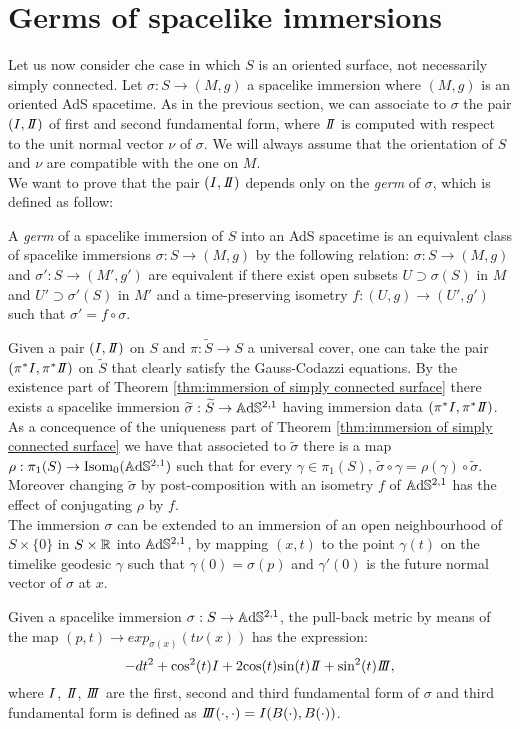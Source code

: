 \section{Germs of spacelike immersions}
Let us now consider che case in which $S$ is an oriented surface, not necessarily simply connected. Let $\sigma: S \to(M,g)$ a spacelike immersion where $(M,g)$ is an oriented AdS spacetime.
As in the previous section, we can associate to $\sigma$ the pair $(\I,\II)$ of first and second  fundamental form, where $\II$ is  computed with respect to the unit normal vector $\nu$ of $\sigma$.
We will always assume that the orientation of $S$ and $\nu$ are compatible with the one on $M$.\\
We want to prove that the pair $(\I,\II)$ depends only on the \textit{germ} of $\sigma$, which is defined as follow:
\begin{definition}
    A \textit{germ} of a spacelike immersion of $S$ into an AdS spacetime is an equivalent class of spacelike immersions $\sigma:S \to(M,g)$ by the following relation: $\sigma:S \to(M,g)$ and $\sigma':S \to(M',g')$ are equivalent if there exist open subsets $U \supset \sigma(S)$ in $M$ and $U' \supset \sigma'(S)$ in $M'$ and a time-preserving isometry $f:(U,g)\to(U',g')$ such that $\sigma' = f \circ \sigma$.
\end{definition}
Given a pair $(\I,\II)$ on $S$ and $\pi: \widetilde{S}\to S$ a universal cover, one can take the pair $(\pi^*\I, \pi^*\II)$ on $\widetilde{S}$ that clearly satisfy the Gauss-Codazzi equations. By the existence part of Theorem \ref{thm:immersion of simply connected surface} there exists a spacelike immersion $\widetilde{\sigma}: \widetilde{S} \to\mathbb{A}\mathrm{d}\mathbb{S}^{2,1}$ having immersion data $(\pi^*\I, \pi^*\II)$. As a concequence of the uniqueness part of Theorem \ref{thm:immersion of simply connected surface} we have that associeted to $\widetilde{\sigma}$ there is a map $\rho:\pi_1(S) \to \text{Isom}_0(\mathbb{A}\mathrm{d}\mathbb{S}^{2,1})$ such that for every $\gamma \in \pi_1(S)$, $\widetilde{\sigma} \circ \gamma = \rho(\gamma) \circ \widetilde{\sigma}$. Moreover changing $\widetilde{\sigma}$ by post-composition with an isometry $f$ of $\mathbb{A}\mathrm{d}\mathbb{S}^{2,1}$ has the effect of conjugating $\rho$ by $f$.\\
The immersion $\sigma$ can be extended to an immersion of an open neighbourhood of $S \times\{0\}$ in $S\times\mathbb{R}$ into $\mathbb{A}\mathrm{d}\mathbb{S}^{2,1}$, by mapping $(x,t)$ to the point $\gamma(t)$ on the timelike geodesic $\gamma$ such that $\gamma(0)=\sigma(p)$ and $\gamma'(0)$ is the future normal vector of $\sigma$ at $x$.
\begin{lemma}\label{lem:tub metric}
    Given a spacelike immersion $\sigma:S\to \mathbb{A}\mathrm{d}\mathbb{S}^{2,1}$, the pull-back metric by means of the map $(p,t) \to exp_{\sigma(x)}(t\nu(x))$ has the expression:
    \begin{equation}\label{eq:tub metric}
        -dt^2 + \text{cos}^2(t)\I + 2\text{cos}(t)\text{sin}(t)\II + \text{sin}^2(t)\III,
    \end{equation}
    where $I$, $\II$, $\III$ are the first, second and third fundamental form of $\sigma$ and third fundamental form is defined as $\III(\cdot,\cdot)=\I(B(\cdot),B(\cdot))$.
\end{lemma}
